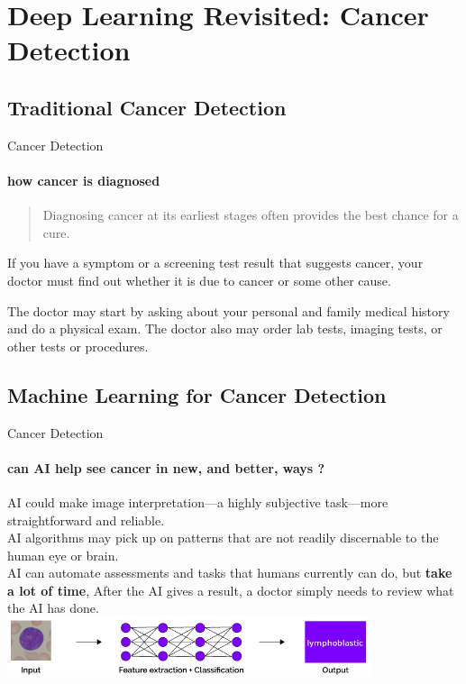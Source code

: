 \documentclass{beamer}
\begin{document}
    \section{Deep Learning Revisited: Cancer Detection}
    \subsection{Traditional Cancer Detection}
    \begin{frame}[t]{Cancer Detection}
      \framesubtitle{how cancer is diagnosed}%
      \begin{quote}
        Diagnosing cancer at its earliest stages often provides the best chance for a cure.
      \end{quote}
      If you have a symptom or a screening test result that suggests cancer, 
      your doctor must find out whether it is due to cancer or some other cause. \\ 
      \vspace{5mm}
      \parbox{0.55\textwidth}{
        The doctor may start by asking about your personal 
        and family medical history and do a physical exam. 
        The doctor also may order lab tests, imaging tests, 
        or other tests or procedures.
      }
    \end{frame}
    \subsection{Machine Learning for Cancer Detection}
    \begin{frame}[t]{Cancer Detection}
      \framesubtitle{can AI help see cancer in new, and better, ways ?}
      AI could make image interpretation—a highly subjective task—more straightforward and reliable. \\
      AI algorithms may pick up on patterns that are not readily discernable to the human eye or brain. \\
      AI can automate assessments and tasks that humans currently can do, but \textbf{take a lot of time},
      After the AI gives a result, a doctor simply needs to review what the AI has done. \\
      \vfill
      \centering
      \includegraphics[height=17.5mm]{resources/lymphblastic-dl}
    \end{frame}
\end{document}
